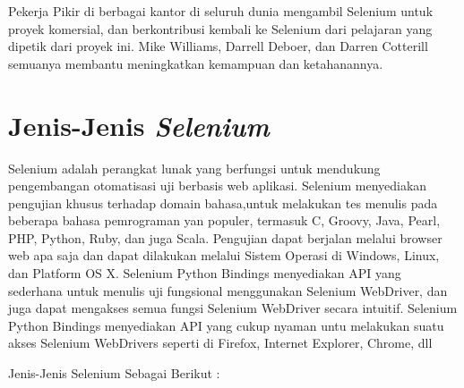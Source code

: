 Pekerja Pikir di berbagai kantor di seluruh dunia mengambil Selenium untuk proyek komersial, dan berkontribusi kembali ke Selenium dari pelajaran yang dipetik dari proyek ini. Mike Williams, Darrell Deboer, dan Darren Cotterill semuanya membantu meningkatkan kemampuan dan ketahanannya.

\section{Jenis-Jenis \textit{Selenium} \textit{}}
Selenium adalah perangkat lunak yang berfungsi untuk mendukung pengembangan otomatisasi uji berbasis web aplikasi. Selenium menyediakan pengujian khusus terhadap domain bahasa,untuk melakukan tes menulis pada beberapa bahasa pemrograman yan populer, termasuk C, Groovy, Java, Pearl, PHP, Python, Ruby, dan juga Scala. Pengujian dapat berjalan melalui browser web apa saja dan dapat dilakukan melalui Sistem Operasi di Windows, Linux, dan Platform OS X. Selenium Python Bindings menyediakan API yang sederhana untuk menulis uji fungsional menggunakan Selenium WebDriver, dan juga dapat mengakses semua fungsi Selenium WebDriver secara intuitif. Selenium Python Bindings menyediakan API yang cukup nyaman untu melakukan suatu akses Selenium WebDrivers seperti di Firefox, Internet Explorer, Chrome, dll 

Jenis-Jenis Selenium Sebagai Berikut :

